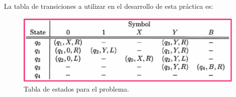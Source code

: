 La tabla de transiciones a utilizar en el desarrollo de esta práctica es:\newline

\begin{figure}[h]
    \begin{center}
    \includegraphics[width=1\linewidth]{Images/tabla.png}
    \end{center}
\caption{Tabla de estados para el problema.}
\label{fig:imagen}
\end{figure}